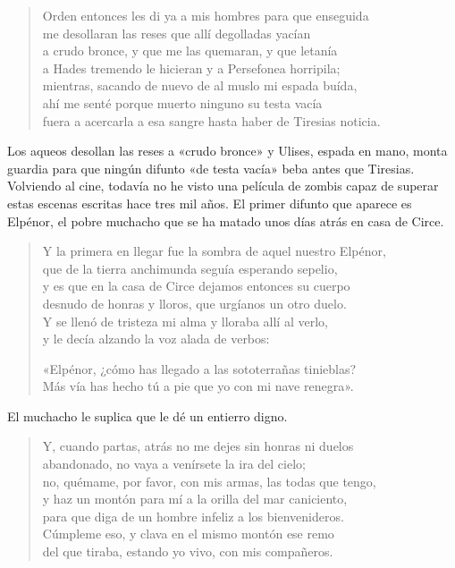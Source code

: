 \documentclass[11pt,a4paper]{article}
\begin{document}
\begin{verse}
Orden entonces les di ya a mis hombres para que enseguida\\
me desollaran las reses que allí degolladas yacían\\
a crudo bronce, y que me las quemaran, y que letanía\\
a Hades tremendo le hicieran y a Persefonea horripila;\\
mientras, sacando de nuevo de al muslo mi espada buída,\\
ahí me senté porque muerto ninguno su testa vacía\\
fuera a acercarla a esa sangre hasta haber de Tiresias noticia.
\end{verse}

Los aqueos desollan las reses a «crudo bronce» y Ulises, espada en mano, monta guardia para que ningún difunto «de testa vacía» beba antes que Tiresias. Volviendo al cine, todavía no he visto una película de zombis capaz de superar estas escenas escritas hace tres mil años. El primer difunto que aparece es Elpénor, el pobre muchacho que se ha matado unos días atrás en casa de Circe.

\begin{verse}
Y la primera en llegar fue la sombra de aquel nuestro Elpénor,\\
que de la tierra anchimunda seguía esperando sepelio,\\
y es que en la casa de Circe dejamos entonces su cuerpo\\
desnudo de honras y lloros, que urgíanos un otro duelo.\\
Y se llenó de tristeza mi alma y lloraba allí al verlo,\\
y le decía alzando la voz alada de verbos:

«Elpénor, ¿cómo has llegado a las sototerrañas tinieblas?\\
Más vía has hecho tú a pie que yo con mi nave renegra».
\end{verse}

El muchacho le suplica que le dé un entierro digno.

\begin{verse}
Y, cuando partas, atrás no me dejes sin honras ni duelos\\
abandonado, no vaya a venírsete la ira del cielo;\\
no, quémame, por favor, con mis armas, las todas que tengo,\\
y haz un montón para mí a la orilla del mar caniciento,\\
para que diga de un hombre infeliz a los bienvenideros.\\
Cúmpleme eso, y clava en el mismo montón ese remo\\
del que tiraba, estando yo vivo, con mis compañeros.
\end{verse}
\end{document}

